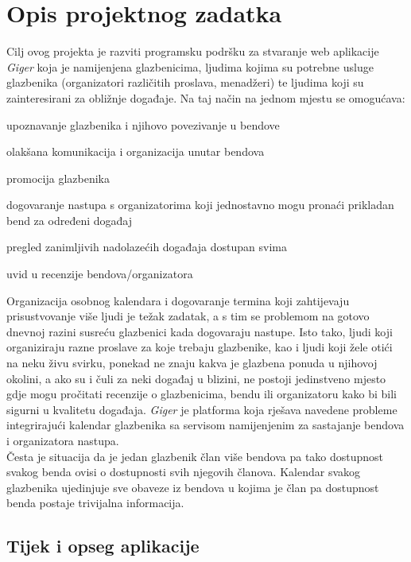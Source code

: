 \chapter{Opis projektnog zadatka}
			
		Cilj ovog projekta je razviti programsku podršku za stvaranje web aplikacije \textit{Giger} koja je namijenjena glazbenicima, ljudima kojima su potrebne usluge glazbenika (organizatori različitih proslava, menadžeri) te ljudima koji su zainteresirani za obližnje događaje. Na taj način na jednom mjestu se omogućava:
		
		\begin{packed_item}
			\item upoznavanje glazbenika i njihovo povezivanje u bendove
			\item olakšana komunikacija i organizacija unutar bendova
			\item promocija glazbenika
			\item dogovaranje nastupa s organizatorima koji jednostavno mogu pronaći prikladan bend za određeni događaj
			\item pregled zanimljivih nadolazećih događaja dostupan svima
			\item uvid u recenzije bendova/organizatora
		\end{packed_item}
	

		Organizacija osobnog kalendara i dogovaranje termina koji zahtijevaju prisustvovanje više ljudi je težak zadatak, a s tim se problemom na gotovo dnevnoj razini susreću glazbenici kada dogovaraju nastupe. Isto tako, ljudi koji organiziraju razne proslave za koje trebaju glazbenike, kao i ljudi koji žele otići na neku živu svirku, ponekad ne znaju kakva je glazbena ponuda u njihovoj okolini, a ako su i čuli za neki događaj u blizini, ne postoji jedinstveno mjesto gdje mogu pročitati recenzije o glazbenicima, bendu ili organizatoru kako bi bili sigurni u kvalitetu događaja.
		\textit{Giger} je platforma koja rješava navedene probleme integrirajući kalendar glazbenika sa servisom namijenjenim za sastajanje bendova i organizatora nastupa. 
		\\
		
		Česta je situacija da je jedan glazbenik član više bendova pa tako dostupnost svakog benda ovisi o dostupnosti svih njegovih članova.  Kalendar svakog glazbenika ujedinjuje sve obaveze iz bendova u kojima je član pa dostupnost benda postaje trivijalna informacija. 
		
		
		
		\section{Tijek i opseg aplikacije}
		
